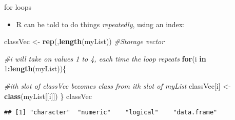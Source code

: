 \documentclass[
  ignorenonframetext,
  aspectratio=169]{beamer}
\newenvironment{Shaded}{\begin{snugshade}}{\end{snugshade}}
\newcommand{\CommentTok}[1]{\textcolor[rgb]{0.56,0.35,0.01}{\textit{#1}}}
\newcommand{\ControlFlowTok}[1]{\textcolor[rgb]{0.13,0.29,0.53}{\textbf{#1}}}
\newcommand{\DecValTok}[1]{\textcolor[rgb]{0.00,0.00,0.81}{#1}}
\newcommand{\FunctionTok}[1]{\textcolor[rgb]{0.13,0.29,0.53}{\textbf{#1}}}
\newcommand{\NormalTok}[1]{#1}
\newcommand{\OtherTok}[1]{\textcolor[rgb]{0.56,0.35,0.01}{#1}}
\newcommand{\SpecialCharTok}[1]{\textcolor[rgb]{0.81,0.36,0.00}{\textbf{#1}}}
\newcommand{\StringTok}[1]{\textcolor[rgb]{0.31,0.60,0.02}{#1}}
\providecommand{\tightlist}{%
  \setlength{\itemsep}{0pt}\setlength{\parskip}{0pt}}
\begin{document}
\begin{frame}[fragile]{for loops}
\protect\hypertarget{for-loops}{}
\begin{itemize}[<+->]
\tightlist
\item
  R can be told to do things \emph{repeatedly}, using an index:
\end{itemize}

\footnotesize

\begin{Shaded}
\begin{Highlighting}[]
\NormalTok{classVec }\OtherTok{\textless{}{-}} \FunctionTok{rep}\NormalTok{(}\StringTok{\textquotesingle{}\textquotesingle{}}\NormalTok{,}\FunctionTok{length}\NormalTok{(myList)) }\CommentTok{\#Storage vector}

\CommentTok{\#i will take on values 1 to 4, each time the loop repeats}
\ControlFlowTok{for}\NormalTok{(i }\ControlFlowTok{in} \DecValTok{1}\SpecialCharTok{:}\FunctionTok{length}\NormalTok{(myList))\{}
  
  \CommentTok{\#ith slot of classVec becomes class from ith slot of myList}
\NormalTok{  classVec[i] }\OtherTok{\textless{}{-}} \FunctionTok{class}\NormalTok{(myList[[i]]) }
\NormalTok{\}}
\NormalTok{classVec}
\end{Highlighting}
\end{Shaded}

\begin{verbatim}
## [1] "character"  "numeric"    "logical"    "data.frame"
\end{verbatim}

\normalsize
\end{frame}
\end{document}
